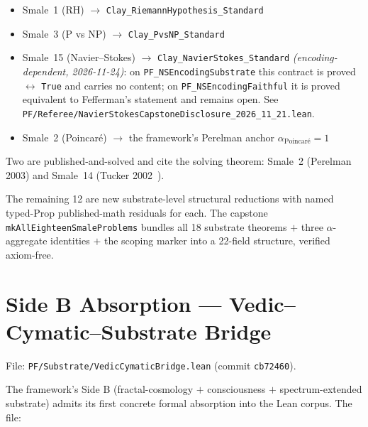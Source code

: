 \begin{itemize}
  \item Smale~1 (RH) $\to$ \texttt{Clay\_RiemannHypothesis\_Standard}
  \item Smale~3 (P vs NP) $\to$ \texttt{Clay\_PvsNP\_Standard}
  \item Smale~15 (Navier--Stokes) $\to$ \texttt{Clay\_NavierStokes\_Standard}
      \emph{(encoding-dependent, 2026-11-24)}: on
      \texttt{PF\_NSEncodingSubstrate} this contract is proved
      $\leftrightarrow$ \texttt{True} and carries no content; on
      \texttt{PF\_NSEncodingFaithful} it is proved equivalent to Fefferman's
      statement and remains open. See
      \texttt{PF/Referee/NavierStokesCapstoneDisclosure\_2026\_11\_21.lean}.
  \item Smale~2 (Poincar\'e) $\to$ the framework's Perelman anchor
    $\alpha_{\text{Poincar\'e}} = 1$
\end{itemize}

\noindent Two are published-and-solved and cite the solving
theorem: Smale~2 (Perelman 2003) and Smale~14 (Tucker
2002~\cite{tucker2002lorenz}).

The remaining 12 are new substrate-level structural reductions with
named typed-Prop published-math residuals for each. The capstone
\texttt{mkAllEighteenSmaleProblems} bundles all 18 substrate
theorems $+$ three $\alpha$-aggregate identities $+$ the
scoping marker into a 22-field structure, verified axiom-free.

\section{Side B Absorption --- Vedic--Cymatic--Substrate Bridge}
\label{sec:refinement-vedic}

File: \texttt{PF/Substrate/VedicCymaticBridge.lean}
(commit \texttt{cb72460}).

The framework's Side B (fractal-cosmology $+$ consciousness $+$
spectrum-extended substrate) admits its first concrete formal
absorption into the Lean corpus. The file:

